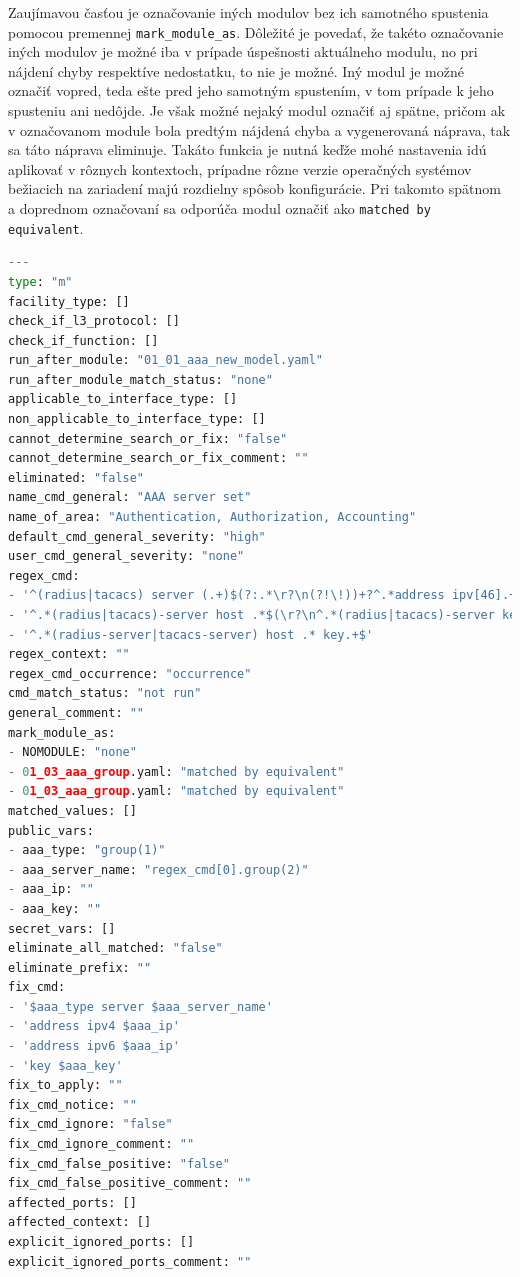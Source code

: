\vspace{1em}

Zaujímavou časťou je označovanie iných modulov bez ich samotného spustenia pomocou premennej \texttt{mark\_module\_as}. Dôležité je povedať, že takéto označovanie iných modulov je možné iba v prípade úspešnosti aktuálneho modulu, no pri nájdení chyby respektíve nedostatku, to nie je možné. Iný modul je možné označiť vopred, teda ešte pred jeho samotným spustením, v tom prípade k jeho spusteniu ani nedôjde. Je však možné nejaký modul označiť aj spätne, pričom ak v označovanom module bola predtým nájdená chyba a vygenerovaná náprava, tak sa táto náprava eliminuje. Takáto funkcia je nutná keďže mohé nastavenia idú aplikovať v rôznych kontextoch, prípadne rôzne verzie operačných systémov bežiacich na zariadení majú rozdielny spôsob konfigurácie. Pri takomto spätnom a doprednom označovaní sa odporúča modul označiť ako \texttt{matched by equivalent}.


\begin{lstlisting}[frame=single,numbers=right,caption={Konfiguračný súbor \texttt{01\_02\_aaa\_server.yaml}, ktorý popisuje základné informácie o~jednom konkrétnom zariadení},label=yaml:module,basicstyle=\ttfamily\small,rulecolor=\color{black}, keywordstyle=\color{black},language=python,breaklines=true]
---
type: "m"
facility_type: []
check_if_l3_protocol: []
check_if_function: []
run_after_module: "01_01_aaa_new_model.yaml"
run_after_module_match_status: "none"
applicable_to_interface_type: []
non_applicable_to_interface_type: [] 
cannot_determine_search_or_fix: "false" 
cannot_determine_search_or_fix_comment: ""
eliminated: "false" 
name_cmd_general: "AAA server set"
name_of_area: "Authentication, Authorization, Accounting"
default_cmd_general_severity: "high" 
user_cmd_general_severity: "none"
regex_cmd:
- '^(radius|tacacs) server (.+)$(?:.*\r?\n(?!\!))+?^.*address ipv[46].+$(?:\r?\n^.*key.+$)?(?:.*\r?\n)*?(?=\!)'
- '^.*(radius|tacacs)-server host .*$(\r?\n^.*(radius|tacacs)-server key.*$)?'
- '^.*(radius-server|tacacs-server) host .* key.+$'
regex_context: ""
regex_cmd_occurrence: "occurrence"
cmd_match_status: "not run"
general_comment: ""
mark_module_as:
- NOMODULE: "none"
- 01_03_aaa_group.yaml: "matched by equivalent"
- 01_03_aaa_group.yaml: "matched by equivalent"
matched_values: []
public_vars:
- aaa_type: "group(1)"
- aaa_server_name: "regex_cmd[0].group(2)"
- aaa_ip: ""
- aaa_key: ""
secret_vars: []
eliminate_all_matched: "false"
eliminate_prefix: ""
fix_cmd: 
- '$aaa_type server $aaa_server_name'
- 'address ipv4 $aaa_ip'
- 'address ipv6 $aaa_ip'
- 'key $aaa_key'
fix_to_apply: "" 
fix_cmd_notice: ""
fix_cmd_ignore: "false"
fix_cmd_ignore_comment: ""
fix_cmd_false_positive: "false"
fix_cmd_false_positive_comment: "" 
affected_ports: []
affected_context: []
explicit_ignored_ports: []
explicit_ignored_ports_comment: "" 
\end{lstlisting}
\newpage
